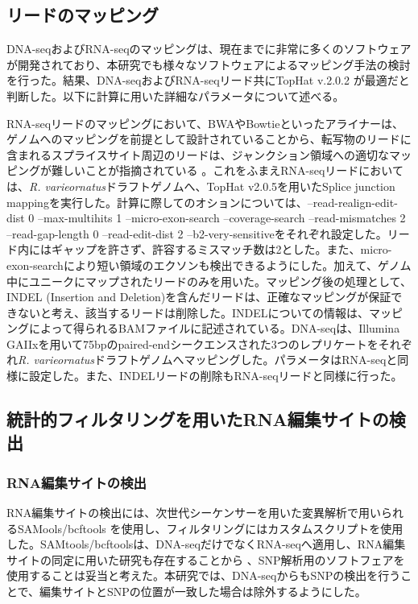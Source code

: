 \subsection{リードのマッピング}
DNA-seqおよびRNA-seqのマッピングは、現在までに非常に多くのソフトウェアが開発されており、本研究でも様々なソフトウェアによるマッピング手法の検討を行った。結果、DNA-seqおよびRNA-seqリード共にTopHat v.2.0.2 \citep{pmid19289445}が最適だと判断した。以下に計算に用いた詳細なパラメータについて述べる。
\par
RNA-seqリードのマッピングにおいて、BWAやBowtieといったアライナーは、ゲノムへのマッピングを前提として設計されていることから、転写物のリードに含まれるスプライスサイト周辺のリードは、ジャンクション領域への適切なマッピングが難しいことが指摘されている \citep{pmid22383036}。これをふまえRNA-seqリードにおいては、{\it R. varieornatus}ドラフトゲノムへ、TopHat v2.0.5を用いたSplice junction mappingを実行した。計算に際してのオションについては、--read-realign-edit-dist 0 --max-multihits 1 --micro-exon-search --coverage-search --read-mismatches 2 --read-gap-length 0 --read-edit-dist 2 --b2-very-sensitiveをそれぞれ設定した。リード内にはギャップを許さず、許容するミスマッチ数は2とした。また、micro-exon-searchにより短い領域のエクソンも検出できるようにした。加えて、ゲノム中にユニークにマップされたリードのみを用いた。マッピング後の処理として、INDEL (Insertion and Deletion)を含んだリードは、正確なマッピングが保証できないと考え、該当するリードは削除した。INDELについての情報は、マッピングによって得られるBAMファイルに記述されている。DNA-seqは、Illumina GAIIxを用いて75bpのpaired-endシークエンスされた3つのレプリケートをそれぞれ{\it R. varieornatus}ドラフトゲノムへマッピングした。パラメータはRNA-seqと同様に設定した。また、INDELリードの削除もRNA-seqリードと同様に行った。

\subsection{統計的フィルタリングを用いたRNA編集サイトの検出}
\subsubsection{RNA編集サイトの検出}
RNA編集サイトの検出には、次世代シーケンサーを用いた変異解析で用いられるSAMools/bcftools \citep{pmid21903627}を使用し、フィルタリングにはカスタムスクリプトを使用した。SAMtools/bcftoolsは、DNA-seqだけでなくRNA-seqへ適用し、RNA編集サイトの同定に用いた研究も存在することから \citep{Danecek:2012aa}、SNP解析用のソフトフェアを使用することは妥当と考えた。本研究では、DNA-seqからもSNPの検出を行うことで、編集サイトとSNPの位置が一致した場合は除外するようにした。

